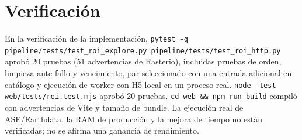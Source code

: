 \documentclass[12pt]{article}
\begin{document}
\section{Verificación}
En la verificación de la implementación, \texttt{pytest -q pipeline/tests/test\_roi\_explore.py pipeline/tests/test\_roi\_http.py} aprobó 20 pruebas (51 advertencias de Rasterio), incluidas pruebas de orden, limpieza ante fallo y vencimiento, par seleccionado con una entrada adicional en catálogo y ejecución de worker con H5 local en un proceso real. \texttt{node --test web/tests/roi.test.mjs} aprobó 20 pruebas. \texttt{cd web \&\& npm run build} compiló con advertencias de Vite y tamaño de bundle. La ejecución real de ASF/Earthdata, la RAM de producción y la mejora de tiempo no están verificadas; no se afirma una ganancia de rendimiento.
\end{document}
